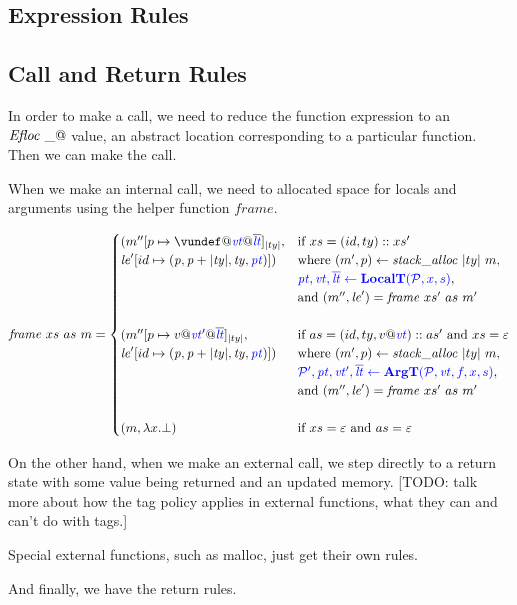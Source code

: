 \documentclass{llncs}
\begin{document}
\subsection{Expression Rules}

\expressions

\subsection{Call and Return Rules}

In order to make a call, we need to reduce the function expression to an \(\mathit{Efloc} ~ \_@\) value, an
abstract location corresponding to a particular function. Then we can make the call.

\callexprstep

When we make an internal call, we need to allocated space for locals and arguments using the helper function
\(\mathit{frame}\).

\[\mathit{frame} ~ xs ~ as ~ \mem =
\begin{cases}
  (\mem''[p \mapsto \vundef@\vt@\overline{\lt}]_{|ty|}, & \textnormal{if } xs = (id,ty)::xs' \\
  \lenv'[id \mapsto (\mathit{p, p+|ty|,ty,\pt})]) &
  \textnormal{where } (\mem',p) \leftarrow \mathit{stack\_alloc} ~ |ty| ~ \mem, \\
  & \trule{\localtres}{\localt}, \\
  & \textnormal{and } (\mem'',\lenv') = \mathit{frame} ~ xs' ~ as ~ m' \\ 
  \\
  (\mem''[p \mapsto v@\vt'@\overline{\lt}]_{|ty|}, & \textnormal{if } as = (id,ty,v @ \vt)::as' \textnormal{ and } xs = \varepsilon \\
  \lenv'[id \mapsto (\mathit{p, p+|ty|,ty,\pt})]) &
  \textnormal{where } (\mem',p) \leftarrow \mathit{stack\_alloc} ~ |ty| ~ \mem, \\
  & \trule{\argtres}{\argt}, \\
  & \textnormal{and } (\mem'',\lenv') = \mathit{frame} ~ xs' ~ as ~ m' \\
  \\
  (\mem, \lambda x . \bot) & \textnormal{if } xs = \varepsilon \textnormal{ and } as = \varepsilon \\
\end{cases}\]

\callstep

On the other hand, when we make an external call, we step directly to a return state with some value
being returned and an updated memory. [TODO: talk more about how the tag policy applies in external
  functions, what they can and can't do with tags.]

\extcallstep

Special external functions, such as malloc, just get their own rules.

\mallocstep

And finally, we have the return rules.

\returnstep
\retvalstep
\retnovalstep
\end{document}
